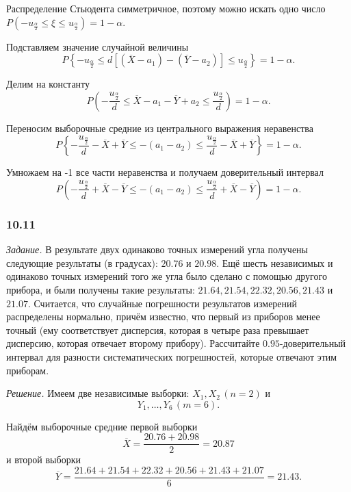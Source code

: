 Распределение Стьюдента симметричное,
поэтому можно искать одно число
$P \left( -u_{ \frac{ \alpha }{2}} \leq \xi \leq u_{ \frac{ \alpha }{2}} \right) =
  1 - \alpha $.

Подставляем значение случайной величины
$$P \left\{
    -u_{ \frac{ \alpha }{2}} \leq
    d \left[ \left( \overline{X} - a_1 \right) - \left( \overline{Y} - a_2 \right) \right] \leq
    u_{ \frac{ \alpha }{2}}
  \right\} =
  1 - \alpha.$$

Делим на константу
$$P \left(
    - \frac{u_{ \frac{ \alpha }{2}}}{d} \leq \overline{X} - a_1 - \overline{Y} + a_2 \leq
    \frac{u_{ \frac{ \alpha }{2}}}{d}
  \right) =
  1 - \alpha.$$

Переносим выборочные средние из центрального выражения неравенства
$$P \left\{
    - \frac{u_{ \frac{ \alpha }{2}}}{d} - \overline{X} + \overline{Y} \leq
    - \left( a_1 - a_2 \right) \leq
    \frac{u_{ \frac{ \alpha }{2}}}{d} - \overline{X} + \overline{Y}
  \right\} =
  1 - \alpha.$$

Умножаем на -1 все части неравенства и получаем доверительный интервал
$$P \left(
    - \frac{u_{ \frac{ \alpha }{2}}}{d} + \overline{X} - \overline{Y} \leq
    - \left( a_1 - a_2 \right) \leq
    \frac{u_{ \frac{ \alpha }{2}}}{d} + \overline{X} - \overline{Y}
  \right) =
  1 - \alpha.$$

\subsubsection*{10.11}

\textit{Задание.}
В результате двух одинаково точных измерений угла получены следующие результаты (в градусах):
$20.76$ и $20.98$.
Ещё шесть независимых
и одинаково точных измерений того же угла было сделано с помощью другого прибора,
и были получены такие результаты: $21.64, 21.54, 22.32, 20.56, 21.43$ и $21.07$.
Считается, что случайные погрешности результатов измерений распределены нормально, причём известно,
что первый из приборов менее точный (ему соответствует дисперсия,
которая в четыре раза превышает дисперсию, которая отвечает второму прибору).
Рассчитайте $0.95$-доверительный интервал для разности систематических погрешностей,
которые отвечают этим приборам.

\textit{Решение.}
Имеем две независимые выборки:
$X_1, X_2 \, \left( n = 2 \right) $ и
$$Y_1, \dotsc, Y_6 \, \left( m = 6 \right).$$

Найдём выборочные средние первой выборки
$$ \overline{X} =
  \frac{20.76 + 20.98}{2} =
  20.87$$
и второй выборки
$$ \overline{Y} =
  \frac{21.64 + 21.54 + 22.32 + 20.56 + 21.43 + 21.07}{6} =
  21.43.$$

